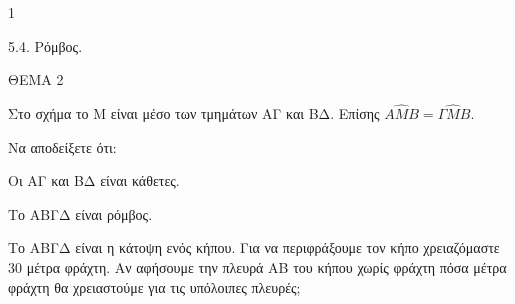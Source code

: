 \begin{ylh}{1}
    \item 5.4. Ρόμβος.
\end{ylh}

ΘΕΜΑ 2

Στο σχήμα το Μ είναι μέσο των τμημάτων ΑΓ και ΒΔ. Επίσης $Α\widehat{Μ}Β = \Gamma\widehat{Μ}Β$.

\begin{alist}
\item Να αποδείξετε ότι:

\begin{rlist}
\item Οι ΑΓ και ΒΔ είναι κάθετες. 

\item Το ΑΒΓΔ είναι ρόμβος. 

\end{rlist}
\item Το ΑΒΓΔ είναι η κάτοψη ενός κήπου. Για να περιφράξουμε τον κήπο χρειαζόμαστε 30 μέτρα φράχτη. Αν αφήσουμε την πλευρά ΑΒ του κήπου χωρίς φράχτη πόσα μέτρα φράχτη θα χρειαστούμε για τις υπόλοιπες πλευρές;



\end{alist}
